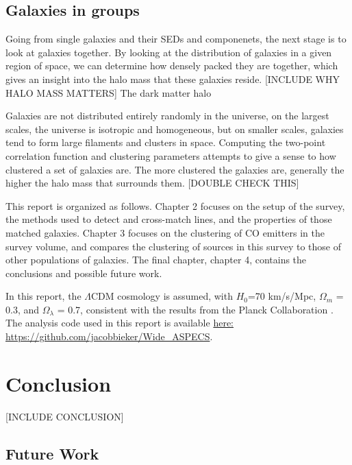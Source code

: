 \documentclass[twoside,single]{lion-msc}
\begin{document}
\section{Galaxies in groups}

Going from single galaxies and their SEDs and componenets, the next stage is to look at galaxies together. By looking at the distribution of galaxies in a given region of space, we can determine how densely packed they are together, which gives an insight into the halo mass that these galaxies reside. [INCLUDE WHY HALO MASS MATTERS] The dark matter halo

Galaxies are not distributed entirely randomly in the universe, on the largest scales, the universe is isotropic and homogeneous, but on smaller scales, galaxies tend to form large filaments and clusters in space. Computing the two-point correlation function and clustering parameters attempts to give a sense to how clustered a set of galaxies are. The more clustered the galaxies are, generally the higher the halo mass that surrounds them. [DOUBLE CHECK THIS]

This report is organized as follows. Chapter 2 focuses on the setup of the survey, the methods used to detect and cross-match lines, and the properties of those matched galaxies. Chapter 3 focuses on the clustering of CO emitters in the survey volume, and compares the clustering of sources in this survey to those of other populations of galaxies. The final chapter, chapter 4, contains the conclusions and possible future work. 

In this report, the $\Lambda$CDM cosmology is assumed, with $H_0$=70 km/s/Mpc, $\Omega_m$ = 0.3, and $\Omega_{\lambda}$ = 0.7, consistent with the results from the Planck Collaboration \cite{ade2016planck}. The analysis code used in this report is available \href{https://github.com/jacobbieker/Wide\_ASPECS}{here: https://github.com/jacobbieker/Wide\_ASPECS}. 





\chapter{Conclusion}

[INCLUDE CONCLUSION]

\section{Future Work}
\end{document}
